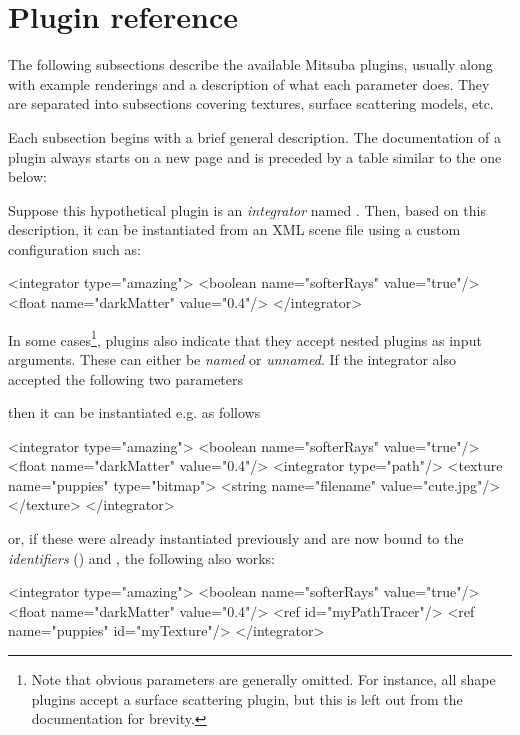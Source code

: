 \section{Plugin reference}
\vspace{-2mm}
The following subsections describe the available Mitsuba plugins, usually along
with example renderings and a description of what each parameter does.
They are separated into subsections covering textures, surface scattering
models, etc.

Each subsection begins with a brief general description.
The documentation of a plugin always starts on a new page and is preceded
by a table similar to the one below:

Suppose this hypothetical plugin is an \emph{integrator} named . Then, based on
this description, it can be instantiated from an XML scene file using a custom configuration such as:
\begin{xml}
<integrator type="amazing">
    <boolean name="softerRays" value="true"/>
    <float name="darkMatter" value="0.4"/>
</integrator>
\end{xml}
In some cases\footnote{Note that obvious parameters are generally omitted.
For instance, all shape plugins accept a surface scattering plugin, but this
is left out from the documentation for brevity.}, plugins also indicate that they accept nested plugins
as input arguments. These can either be \emph{named} or \emph{unnamed}. If
the  integrator also accepted the following two parameters\vspace{-2mm}
\vspace{-1mm}

then it can be instantiated e.g. as follows
\begin{xml}
<integrator type="amazing">
    <boolean name="softerRays" value="true"/>
    <float name="darkMatter" value="0.4"/>
    <integrator type="path"/>
    <texture name="puppies" type="bitmap">
        <string name="filename" value="cute.jpg"/>
    </texture>
</integrator>
\end{xml}
or, if these were already instantiated previously and are now
bound to the \emph{identifiers} ()  and
, the following also works:
\begin{xml}
<integrator type="amazing">
    <boolean name="softerRays" value="true"/>
    <float name="darkMatter" value="0.4"/>
    <ref id="myPathTracer"/>
    <ref name="puppies" id="myTexture"/>
</integrator>
\end{xml}


